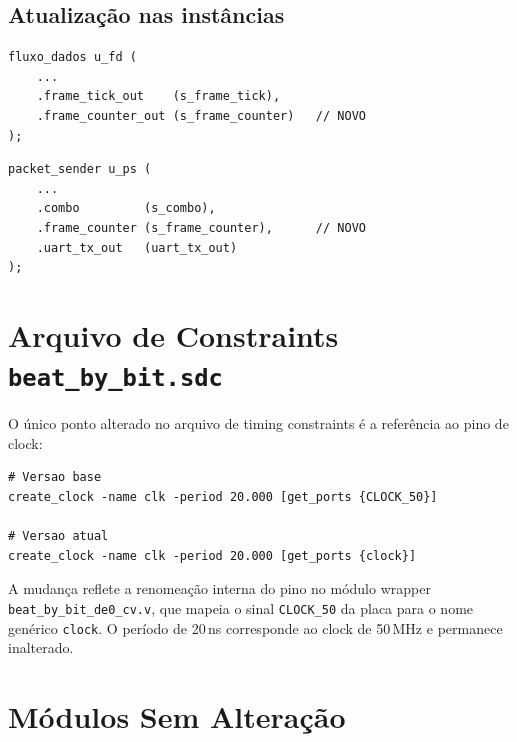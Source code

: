 \documentclass[12pt, a4paper]{article}
\begin{document}
\subsection{Atualização nas instâncias}

\begin{lstlisting}[caption={Instância de fluxo\_dados — nova conexão}]
fluxo_dados u_fd (
    ...
    .frame_tick_out    (s_frame_tick),
    .frame_counter_out (s_frame_counter)   // NOVO
);
\end{lstlisting}

\begin{lstlisting}[caption={Instância de packet\_sender — nova conexão}]
packet_sender u_ps (
    ...
    .combo         (s_combo),
    .frame_counter (s_frame_counter),      // NOVO
    .uart_tx_out   (uart_tx_out)
);
\end{lstlisting}

\section{Arquivo de Constraints \texttt{beat\_by\_bit.sdc}}

O único ponto alterado no arquivo de timing constraints é a referência ao
pino de clock:

\begin{lstlisting}[language={},caption={Constraint de clock}]
# Versao base
create_clock -name clk -period 20.000 [get_ports {CLOCK_50}]

# Versao atual
create_clock -name clk -period 20.000 [get_ports {clock}]
\end{lstlisting}

A mudança reflete a renomeação interna do pino no módulo wrapper
\texttt{beat\_by\_bit\_de0\_cv.v}, que mapeia o sinal \texttt{CLOCK\_50}
da placa para o nome genérico \texttt{clock}. O período de 20\,ns
corresponde ao clock de 50\,MHz e permanece inalterado.

\section{Módulos Sem Alteração}
\end{document}
